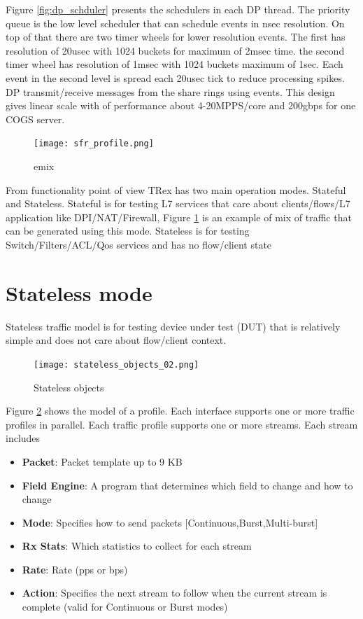 \documentclass[conference]{IEEEtran}
\begin{document}
Figure \ref{fig:dp_schduler} presents the schedulers in each DP thread. The priority queue is the low level scheduler that can schedule events in nsec resolution. On top of that there are two timer wheels for lower resolution events. The first has resolution of 20usec with 1024 buckets for maximum of 2msec time. 
the second timer wheel has resolution of 1msec with 1024 buckets maximum of 1sec. Each event in the second level is spread each 20usec tick to reduce processing spikes. 
DP transmit/receive messages from the share rings using events. 
This design gives linear scale with of performance about 4-20MPPS/core and 200gbps for one COGS server. 

\begin{figure}[h]
  \texttt{[image: sfr\_profile.png]}
  \caption{emix}
  \label{fig:emix}
\end{figure}

From functionality point of view TRex has two main operation modes. Stateful and Stateless. 
Stateful is for testing L7 services that care about clients/flows/L7 application like DPI/NAT/Firewall, Figure \ref{fig:emix} is an example of mix of traffic that can be generated using this mode. 
Stateless is for testing Switch/Filters/ACL/Qos services and has no flow/client state

\section{Stateless mode}

Stateless traffic model is for testing  device under test (DUT) that is relatively simple and does not care about flow/client context. 

\begin{figure}[h]
  \texttt{[image: stateless\_objects\_02.png]}
  \caption{Stateless objects}
  \label{fig:stlobjects}
\end{figure}

Figure \ref{fig:stlobjects} shows the model of a profile. Each interface supports one or more traffic profiles in parallel.
Each traffic profile supports one or more streams. Each stream includes

\begin{itemize}
  \item \textbf{Packet}: Packet template up to 9 KB
  \item \textbf{Field Engine}: A program that determines which field to change and how to change 
  \item \textbf{Mode}: Specifies how to send packets [Continuous,Burst,Multi-burst]
  \item \textbf{Rx Stats}: Which statistics to collect for each stream
  \item \textbf{Rate}: Rate (pps or bps)
  \item \textbf{Action}: Specifies the next stream to follow when the current stream is complete (valid for Continuous or Burst modes)
\end{itemize}
\end{document}
